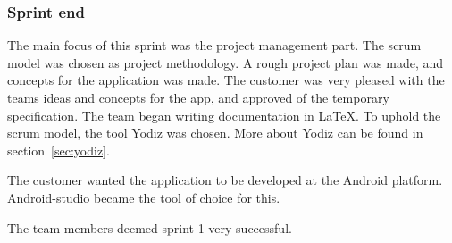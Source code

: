 \subsubsection{Sprint end}
The main focus of this sprint was the project management part. The scrum model was chosen as project methodology. 
A rough project plan was made, and concepts for the application was made.
The customer was very pleased with the teams ideas and concepts for the app, and approved of the temporary specification. 
The team began writing documentation in \LaTeX. To uphold the scrum model, the tool Yodiz was chosen. More about Yodiz can be found in section~\ref{sec:yodiz}.

The customer wanted the application to be developed at the Android platform. Android-studio became the tool of choice for this.

The team members deemed sprint 1 very successful.

